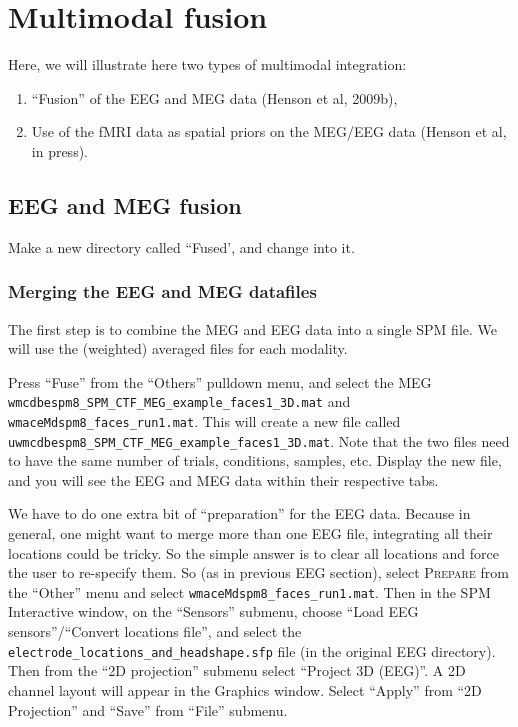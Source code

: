 \section{Multimodal fusion\label{multimodal:fusion}}

Here, we will illustrate here two types of multimodal integration:
\begin{enumerate}
 \item ``Fusion'' of the EEG and MEG data (Henson et al, 2009b),
 \item Use of the fMRI data as spatial priors on the MEG/EEG data (Henson et al, in press).
\end{enumerate}

\subsection{EEG and MEG fusion \label{multimodal:fusion:eegmeg:fusion}}

Make a new directory called ``Fused', and change into it.

\subsubsection{Merging the EEG and MEG datafiles \label{multimodal:fusion:eegmeg:merge}}

The first step is to combine the MEG and EEG data into a single SPM file. We will use the (weighted) averaged files for each modality.

Press ``Fuse'' from the ``Others'' pulldown menu, and select the MEG \texttt{wmcdbespm8\_\-SPM\_\-CTF\_\-MEG\_\-example\_\-faces1\_\-3D.mat} and \texttt{wmaceMdspm8\_faces\_run1.mat}. This will create a new file called \texttt{uwmcdbespm8\_\-SPM\_\-CTF\_\-MEG\_\-example\_\-faces1\_\-3D.mat}. Note that the two files need to have the same number of trials, conditions, samples, etc. Display the new file, and you will see the EEG and MEG data within their respective tabs.

We have to do one extra bit of ``preparation'' for the EEG data. Because in general, one might want to merge more than one EEG file, integrating all their locations could be tricky. So the simple answer is to clear all locations and force the user to re-specify them. So (as in previous EEG section), select \textsc{Prepare} from the ``Other'' menu and select \texttt{wmaceMdspm8\_faces\_run1.mat}. Then in the SPM Interactive window, on the ``Sensors'' submenu, choose ``Load EEG sensors''/``Convert locations file'', and select the \texttt{electrode\_locations\_and\_headshape.sfp} file (in the original EEG directory). Then from the ``2D projection'' submenu select ``Project 3D (EEG)''. A 2D channel layout will appear in the Graphics window. Select ``Apply'' from ``2D Projection'' and ``Save'' from ``File'' submenu.

